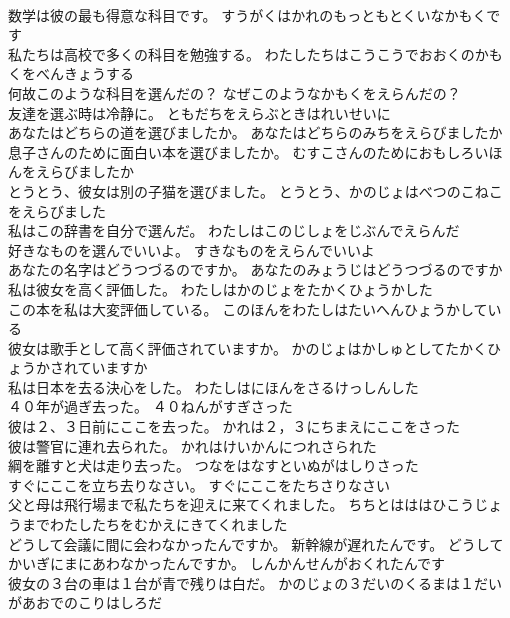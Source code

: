 \documentclass[8pt]{extreport}
\begin{document}
\begin{CJK}{UTF8}{min}
\\	数学は彼の最も得意な科目です。	すうがくはかれのもっともとくいなかもくです 
\\	私たちは高校で多くの科目を勉強する。	わたしたちはこうこうでおおくのかもくをべんきょうする 
\\	何故このような科目を選んだの？	なぜこのようなかもくをえらんだの？ 
\\	友達を選ぶ時は冷静に。	ともだちをえらぶときはれいせいに 
\\	あなたはどちらの道を選びましたか。	あなたはどちらのみちをえらびましたか 
\\	息子さんのために面白い本を選びましたか。	むすこさんのためにおもしろいほんをえらびましたか 
\\	とうとう、彼女は別の子猫を選びました。	とうとう、かのじょはべつのこねこをえらびました 
\\	私はこの辞書を自分で選んだ。	わたしはこのじしょをじぶんでえらんだ 
\\	好きなものを選んでいいよ。	すきなものをえらんでいいよ 
\\	あなたの名字はどうつづるのですか。	あなたのみょうじはどうつづるのですか 
\\	私は彼女を高く評価した。	わたしはかのじょをたかくひょうかした 
\\	この本を私は大変評価している。	このほんをわたしはたいへんひょうかしている 
\\	彼女は歌手として高く評価されていますか。	かのじょはかしゅとしてたかくひょうかされていますか 
\\	私は日本を去る決心をした。	わたしはにほんをさるけっしんした 
\\	４０年が過ぎ去った。	４０ねんがすぎさった 
\\	彼は２、３日前にここを去った。	かれは２，３にちまえにここをさった 
\\	彼は警官に連れ去られた。	かれはけいかんにつれさられた 
\\	綱を離すと犬は走り去った。	つなをはなすといぬがはしりさった 
\\	すぐにここを立ち去りなさい。	すぐにここをたちさりなさい 
\\	父と母は飛行場まで私たちを迎えに来てくれました。	ちちとはははひこうじょうまでわたしたちをむかえにきてくれました 
\\	どうして会議に間に会わなかったんですか。 新幹線が遅れたんです。	どうしてかいぎにまにあわなかったんですか。 しんかんせんがおくれたんです 
\\	彼女の３台の車は１台が青で残りは白だ。	かのじょの３だいのくるまは１だいがあおでのこりはしろだ 

\end{CJK}
\end{document}
